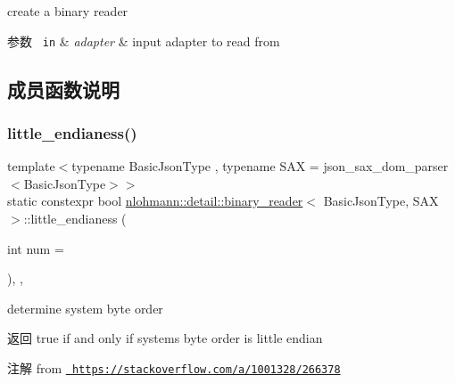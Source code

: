 create a binary reader 


\begin{DoxyParams}[1]{参数}
\mbox{\texttt{ in}}  & {\em adapter} & input adapter to read from \\
\hline
\end{DoxyParams}


\subsection{成员函数说明}
\mbox{\label{classnlohmann_1_1detail_1_1binary__reader_a1e31dbfcf9567c8c2d4f0e4eb1b0230a}} 
\subsubsection{\texorpdfstring{little\_endianess()}{little\_endianess()}}
{\footnotesize\ttfamily template$<$typename Basic\+Json\+Type , typename S\+AX  = json\+\_\+sax\+\_\+dom\+\_\+parser$<$\+Basic\+Json\+Type$>$$>$ \\
static constexpr bool \mbox{\hyperlink{classnlohmann_1_1detail_1_1binary__reader}{nlohmann\+::detail\+::binary\+\_\+reader}}$<$ Basic\+Json\+Type, S\+AX $>$\+::little\+\_\+endianess (\begin{DoxyParamCaption}\item[{int}]{num = {} }\end{DoxyParamCaption})\hspace{0.3cm}{\ttfamily [inline]}, {\ttfamily [static]}, {\ttfamily [noexcept]}}



determine system byte order 

\begin{DoxyReturn}{返回}
true if and only if system\textquotesingle{}s byte order is little endian
\end{DoxyReturn}
\begin{DoxyNote}{注解}
from \href{https://stackoverflow.com/a/1001328/266378}{\texttt{ https\+://stackoverflow.\+com/a/1001328/266378}} 
\end{DoxyNote}
\mbox{\label{classnlohmann_1_1detail_1_1binary__reader_ab94a54d6e595c2620b07589cf4116256}} 
